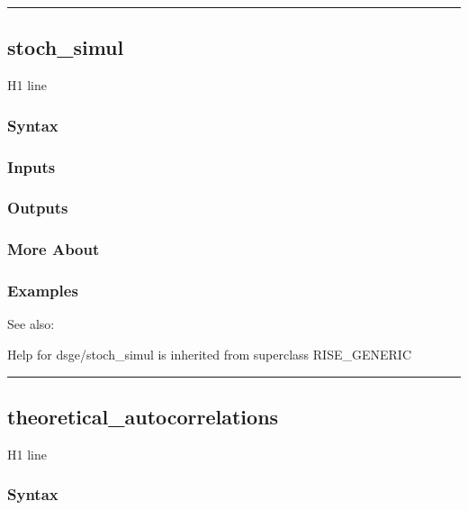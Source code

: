 \documentclass[letterpaper,10pt,english]{sphinxmanual}
\begin{document}
\bigskip\hrule{}\bigskip



\subsection{stoch\_simul}
\label{classes/models/@dsge/dsge:stoch-simul}\label{classes/models/@dsge/dsge:id191}
H1 line


\subsubsection{Syntax}
\label{classes/models/@dsge/dsge:id192}

\subsubsection{Inputs}
\label{classes/models/@dsge/dsge:id193}

\subsubsection{Outputs}
\label{classes/models/@dsge/dsge:id194}

\subsubsection{More About}
\label{classes/models/@dsge/dsge:id195}

\subsubsection{Examples}
\label{classes/models/@dsge/dsge:id196}
See also:

Help for dsge/stoch\_simul is inherited from superclass RISE\_GENERIC


\bigskip\hrule{}\bigskip



\subsection{theoretical\_autocorrelations}
\label{classes/models/@dsge/dsge:theoretical-autocorrelations}\label{classes/models/@dsge/dsge:id197}
H1 line


\subsubsection{Syntax}
\label{classes/models/@dsge/dsge:id198}
\end{document}
